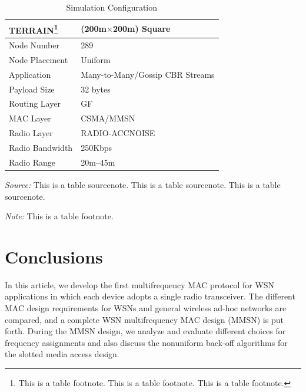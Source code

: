 \begin{table}%
\caption{Simulation Configuration}
\label{tab:one}
\begin{minipage}{\columnwidth}
\begin{center}
\begin{tabular}{ll}
  \toprule
  TERRAIN\footnote{This is a table footnote. This is a
    table footnote. This is a table footnote.}   & (200m$\times$200m) Square\\ \midrule
  Node Number     & 289\\
  Node Placement  & Uniform\\
  Application     & Many-to-Many/Gossip CBR Streams\\
  Payload Size    & 32 bytes\\
  Routing Layer   & GF\\
  MAC Layer       & CSMA/MMSN\\
  Radio Layer     & RADIO-ACCNOISE\\
  Radio Bandwidth & 250Kbps\\
  Radio Range     & 20m--45m\\
  \bottomrule
\end{tabular}
\end{center}
\bigskip\centering
\footnotesize\emph{Source:} This is a table
 sourcenote. This is a table sourcenote. This is a table
 sourcenote.

 \emph{Note:} This is a table footnote.
\end{minipage}
\end{table}%


\section{Conclusions}

In this article, we develop the first multifrequency MAC protocol for
WSN applications in which each device adopts a
single radio transceiver. The different MAC design requirements for
WSNs and general wireless ad-hoc networks are
compared, and a complete WSN multifrequency MAC design (MMSN) is
put forth. During the MMSN design, we analyze and evaluate different
choices for frequency assignments and also discuss the nonuniform
back-off algorithms for the slotted media access design.


